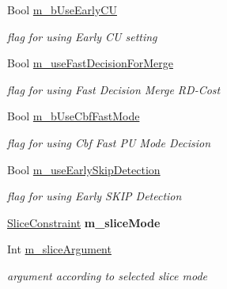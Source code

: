 \begin{DoxyCompactItemize}
\mbox{\label{class_t_app_enc_cfg_ab1964e4d5ba8366e6dffd9acf19cc0bd}} 
Bool \hyperlink{class_t_app_enc_cfg_ab1964e4d5ba8366e6dffd9acf19cc0bd}{m\+\_\+b\+Use\+Early\+CU}
\begin{DoxyCompactList}\small\item\em flag for using Early CU setting \end{DoxyCompactList}\item 
\mbox{\label{class_t_app_enc_cfg_ace4f38efb8000a6781a4afd01283009a}} 
Bool \hyperlink{class_t_app_enc_cfg_ace4f38efb8000a6781a4afd01283009a}{m\+\_\+use\+Fast\+Decision\+For\+Merge}
\begin{DoxyCompactList}\small\item\em flag for using Fast Decision Merge R\+D-\/\+Cost \end{DoxyCompactList}\item 
\mbox{\label{class_t_app_enc_cfg_a644321d96e759f67c4e16b1bb790a4ad}} 
Bool \hyperlink{class_t_app_enc_cfg_a644321d96e759f67c4e16b1bb790a4ad}{m\+\_\+b\+Use\+Cbf\+Fast\+Mode}
\begin{DoxyCompactList}\small\item\em flag for using Cbf Fast PU Mode Decision \end{DoxyCompactList}\item 
\mbox{\label{class_t_app_enc_cfg_a0f8588e327e9cfad83dee282dd0c9084}} 
Bool \hyperlink{class_t_app_enc_cfg_a0f8588e327e9cfad83dee282dd0c9084}{m\+\_\+use\+Early\+Skip\+Detection}
\begin{DoxyCompactList}\small\item\em flag for using Early S\+K\+IP Detection \end{DoxyCompactList}\item 
\mbox{\label{class_t_app_enc_cfg_a2210270f6a97619580f698db43b02df5}} 
\hyperlink{_type_def_8h_add7235a66eb4e5f93c692468c39dde44}{Slice\+Constraint} {\bfseries m\+\_\+slice\+Mode}
\item 
\mbox{\label{class_t_app_enc_cfg_aca2824591f12233e9c56da91bfeac893}} 
Int \hyperlink{class_t_app_enc_cfg_aca2824591f12233e9c56da91bfeac893}{m\+\_\+slice\+Argument}
\begin{DoxyCompactList}\small\item\em argument according to selected slice mode \end{DoxyCompactList}\item 

\end{DoxyCompactItemize}
